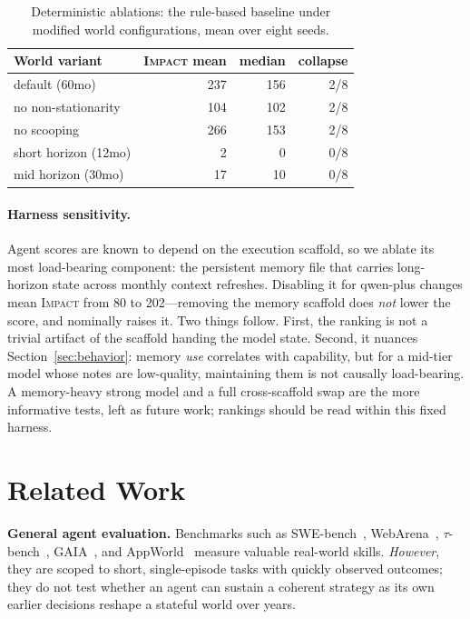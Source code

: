 \documentclass[11pt]{article}
\newcommand{\impact}{\textsc{Impact}}
\begin{document}
\begin{table}[t]
\centering
\small
\caption{Deterministic ablations: the rule-based baseline under modified world configurations,
mean over eight seeds.}
\label{tab:ablation}
\begin{tabular}{lrrr}
\toprule
World variant & \impact{} mean & median & collapse \\
\midrule
default (60mo)        & 237 & 156 & 2/8 \\
no non-stationarity   & 104 & 102 & 2/8 \\
no scooping           & 266 & 153 & 2/8 \\
short horizon (12mo)  & 2   & 0   & 0/8 \\
mid horizon (30mo)    & 17  & 10  & 0/8 \\
\bottomrule
\end{tabular}
\end{table}

\paragraph{Harness sensitivity.} Agent scores are known to depend on the execution scaffold, so we
ablate its most load-bearing component: the persistent memory file that carries long-horizon state
across monthly context refreshes. Disabling it for qwen-plus changes mean \impact{} from 80 to
202---removing the memory scaffold does \emph{not} lower the score, and nominally raises it. Two
things follow. First, the ranking is not a trivial artifact of the scaffold handing the model state.
Second, it nuances Section~\ref{sec:behavior}: memory \emph{use} correlates with capability, but for
a mid-tier model whose notes are low-quality, maintaining them is not causally load-bearing. A
memory-heavy strong model and a full cross-scaffold swap are the more informative tests, left as
future work; rankings should be read within this fixed harness.

\section{Related Work}
\textbf{General agent evaluation.} Benchmarks such as SWE-bench~\citep{jimenez2024swebench},
WebArena~\citep{zhou2024webarena}, $\tau$-bench~\citep{yao2025taubench},
GAIA~\citep{mialon2024gaia}, and AppWorld~\citep{trivedi2024appworld} measure valuable real-world
skills. \emph{However}, they are scoped to short, single-episode tasks with quickly observed
outcomes; they do not test whether an agent can sustain a coherent strategy as its own earlier
decisions reshape a stateful world over years.
\end{document}
